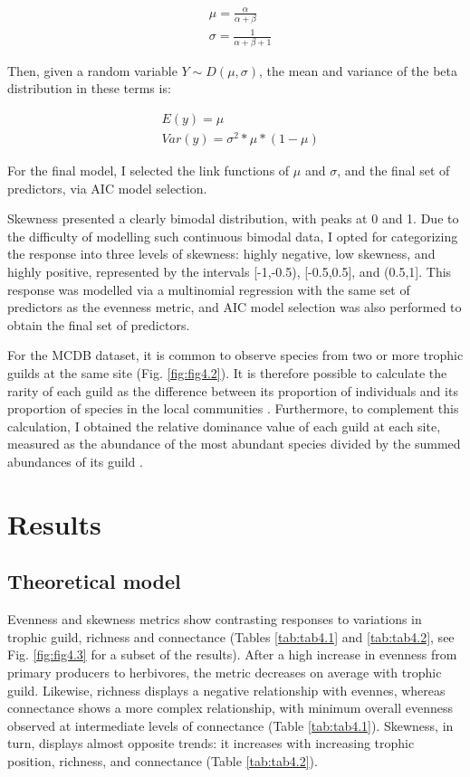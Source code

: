 \begin{align}%
& \mu = \frac{\alpha}{\alpha + \beta} \\
& \sigma = \frac{1}{\alpha + \beta + 1}
\end{align}

Then, given a random variable $Y \sim D(\mu,\sigma)$, the mean and variance of the beta distribution in these terms is:

\begin{align}\label{eq:eq4.4}
& E(y) = \mu \\
& Var(y) = \sigma^2 * \mu * (1-\mu)
\end{align}

For the final model, I selected the link functions of $\mu$ and $\sigma$, and the final set of predictors, via AIC model selection.

Skewness presented a clearly bimodal distribution, with peaks at 0 and 1. Due to the difficulty of modelling such continuous bimodal data, I opted for categorizing the response into three levels of skewness: highly negative, low skewness, and highly positive, represented by the intervals [-1,-0.5), [-0.5,0.5], and (0.5,1]. This response was modelled via a multinomial regression with the same set of predictors as the evenness metric, and AIC model selection was also performed to obtain the final set of predictors.

For the MCDB dataset, it is common to observe species from two or more trophic guilds at the same site (Fig. \ref{fig:fig4.2}). It is therefore possible to calculate the rarity of each guild as the difference between its proportion of individuals and its proportion of species in the local communities \citep{Spencer2000}. Furthermore, to complement this calculation, I obtained the relative dominance value of each guild at each site, measured as the abundance of the most abundant species divided by the summed abundances of its guild \citep{Spencer2000, Dornelas2011}.

\section{Results}

\subsection*{Theoretical model}

Evenness and skewness metrics show contrasting responses to variations in trophic guild, richness and connectance (Tables \ref{tab:tab4.1} and \ref{tab:tab4.2}, see Fig. \ref{fig:fig4.3} for a subset of the results). After a high increase in evenness from primary producers to herbivores, the metric decreases on average with trophic guild. Likewise, richness displays a negative relationship with evennes, whereas connectance shows a more complex relationship, with minimum overall evenness observed at intermediate levels of connectance (Table \ref{tab:tab4.1}). Skewness, in turn, displays almost opposite trends: it increases with increasing trophic position, richness, and connectance (Table \ref{tab:tab4.2}).

